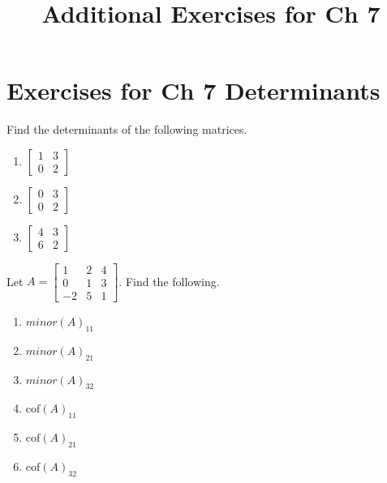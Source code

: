 \documentclass{ximera}
\title{Additional Exercises for Ch 7} \license{CC BY-NC-SA 4.0}
\begin{document}
\begin{abstract}
\end{abstract}
\maketitle

\section*{Exercises for Ch 7 Determinants}

\begin{problem}\label{prb:7.1} Find the determinants of the following matrices.

\begin{enumerate}
\item $\left[
\begin{array}{rr}
1 & 3 \\
0 & 2
\end{array}
\right]$

\item $\left[
\begin{array}{rr}
0 & 3 \\
0 & 2
\end{array}
\right]$

\item $\left[
\begin{array}{rr}
4 & 3 \\
6 & 2
\end{array}
\right]$
\end{enumerate}
\end{problem}

\begin{problem}\label{prb:7.2} Let $A = \left[ \begin{array}{rrr}
1 & 2 & 4 \\
0 & 1 & 3 \\
-2 & 5 & 1
\end{array} \right]$. Find the following.
\begin{enumerate}
\item $minor(A)_{11}$
\item $minor(A)_{21}$
\item $minor(A)_{32}$
\item $\mbox{cof}(A)_{11}$
\item $\mbox{cof}(A)_{21}$
\item $\mbox{cof}(A)_{32}$
\end{enumerate}
\end{problem}
\end{document}
